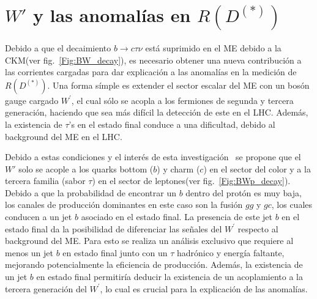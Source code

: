 \chapter{$W'$ y las anomalías en $R(D^{(*)})$}
\label{Ch:results}
Debido a que el decaimiento $b \to c \tau \nu$ está suprimido en el ME debido a la CKM(ver fig.~\ref{Fig:BW_decay}), es necesario obtener una nueva contribución a las corrientes cargadas para dar explicación a las anomalías en la medición de $R(D^{(*)})$. Una forma símple es extender el sector escalar del ME con un bosón gauge cargado $W^{\prime}$, el cual sólo se acopla a los fermiones de segunda y tercera generación, haciendo que sea más difícil la detección de este en el LHC. Además, la existencia de $\tau$’s en el estado final conduce a una dificultad, debido al background del ME en el LHC.

Debido a estas condiciones y el interés de esta investigación~\cite{Abdullah:2018ets} se propone que el $W'$ solo se acople a los quarks bottom ($b$) y charm ($c$) en el sector del color y a la tercera familia (sabor $\tau$) en el sector de leptones(ver fig.~\ref{Fig:BWp_decay}). Debido a que la probabilidad de encontrar un $b$ dentro del protón es muy baja, los canales de producción dominantes en este caso son la fusión $g g$ y $g c$, los cuales conducen a un jet $b$ asociado en el estado final. La presencia de este jet $b$ en el estado final da la posibilidad de diferenciar las señales del $W^{\prime}$ respecto al background del ME. Para esto se realiza un análisis exclusivo que requiere al menos un jet $b$ en estado final junto con un $\tau$ hadrónico y energía faltante, mejorando potencialmente la eficiencia de producción. Además, la existencia de un jet $b$ en estado final permitiría deducir la existencia de un acoplamiento a la tercera generación del $W^{\prime}$, lo cual es crucial para la explicación de las anomalías. 

